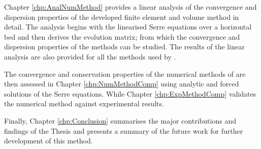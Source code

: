 Chapter \ref{chp:AnalNumMethod} provides a linear analysis of the convergence and dispersion properties of the developed finite element and volume method in detail. The analysis begins with the linearised Serre equations over a horizontal bed and then derives the evolution matrix; from which the convergence and dispersion properties of the methods can be studied. The results of the linear analysis are also provided for all the methods used by \citet{Pitt-2018-61}.

The convergence and conservation properties of the numerical methods of \citet{Pitt-2018-61} are then assessed in Chapter \ref{chp:NumMethodComp} using analytic and forced solutions of the Serre equations. While Chapter \ref{chp:ExpMethodComp} validates the numerical method against experimental results.

Finally, Chapter \ref{chp:Conclusion} summarises the major contributions and findings of the Thesis and presents a summary of the future work for further development of this method. 


